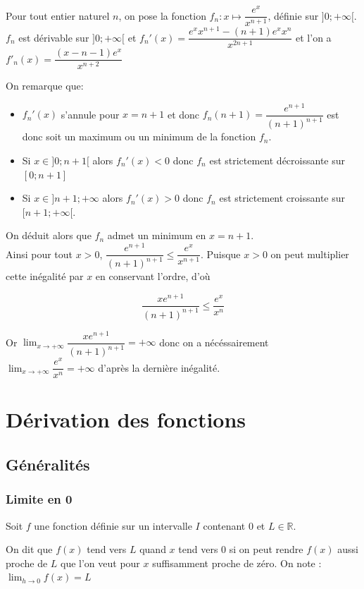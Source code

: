 \documentclass[french]{book}
\newcommand{\R}{\mathbb {R}}
\newcommand{\ie}{\leq}
\newcommand{\ds}{\displaystyle}
\newcommand{\limo}[1][x]{\ds\lim_{#1\rightarrow 0}}
\newcommand{\limpinf}[1][x]{\ds\lim_{#1\rightarrow +\infty}}
\begin{document}
\begin{demo}
Pour tout entier naturel $n$, on pose la fonction $f_n: x \mapsto \dfrac{e^x}{x^{n+1}}$, définie sur $]0;+ \infty[$. \\

$f_n$ est dérivable sur $]0;+ \infty[$ et $f_n'(x)=\dfrac{e^x x^{n+1}-(n+1)e^x x^n} {x^{2n+1}}$ et l'on a  $f'_n(x)=\dfrac{(x-n-1)e^x}{x^{n+2}}$

On remarque que: 

\begin{itemize}
\item[$\bullet$] $f_n'(x)$ s'annule pour $x=n+1$ et donc $f_n(n+1)=\dfrac{e^{n+1}}{(n+1)^{n+1}}$ est donc soit un maximum ou un minimum de la fonction $f_n$.
\item[$\bullet$] Si $x\in ]0; n+1[$ alors $f_n'(x)<0$ donc $f_n$ est strictement décroissante sur $ [0; n+1]$
\item[$\bullet$] Si $x\in ]n+1;+ \infty$ alors $f_n'(x)>0$ donc $f_n$ est strictement croissante sur $ [n+1;+ \infty[$.\\
\end{itemize}

On déduit alors que $f_n$ admet un minimum en $x=n+1$.\\

Ainsi pour tout $x>0$, $\dfrac{e^{n+1}}{(n+1)^{n+1}} \ie \dfrac{e^x}{x^{n+1}}$. Puisque $x>0$ on peut multiplier cette inégalité par $x$ en conservant l'ordre, d'où

$$\dfrac{xe^{n+1}}{(n+1)^{n+1}} \ie \dfrac{e^x}{x^{n}}$$

Or $\limpinf \dfrac{xe^{n+1}}{(n+1)^{n+1}} = + \infty$ donc on a nécéssairement $\limpinf  \dfrac{e^x}{x^{n}} = + \infty$ d'après la dernière inégalité.

\end{demo}


\chapter{Dérivation des fonctions}
\section{Généralités}
\subsection{Limite en 0}
\begin{defn}
Soit $f$ une fonction définie sur un intervalle $I$ contenant 0 et $L \in \R$.

On dit que $f(x)$ tend vers $L$ quand $x$ tend vers 0 si on peut rendre $f(x)$ aussi proche de $L$ que l'on veut pour $x$ suffisamment proche de zéro. On note : $\limo[h] f(x)=L$
\end{defn}
\end{document}
